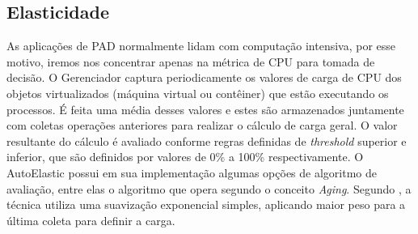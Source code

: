 \documentclass[twoside,english,brazilian]{UNISINOSartigo}
\begin{document}
\subsection{Elasticidade}
As aplicações de PAD normalmente lidam com computação intensiva, por esse motivo, iremos nos concentrar apenas na métrica de CPU para tomada de decisão. O Gerenciador captura periodicamente os valores de carga de CPU dos objetos virtualizados (máquina virtual ou contêiner) que estão executando os processos. É feita uma média desses valores e estes são armazenados juntamente com coletas operações anteriores para realizar o cálculo de carga geral. O valor resultante do cálculo é avaliado conforme regras definidas de \textit{threshold} superior e inferior, que são definidos por valores de 0\% a 100\% respectivamente. O AutoElastic possui em sua implementação algumas opções de algoritmo de avaliação, entre elas o algoritmo que opera segundo o conceito \textit{Aging}. Segundo , a técnica utiliza uma suavização exponencial simples, aplicando maior peso para a última coleta para definir a carga.

\end{document}
